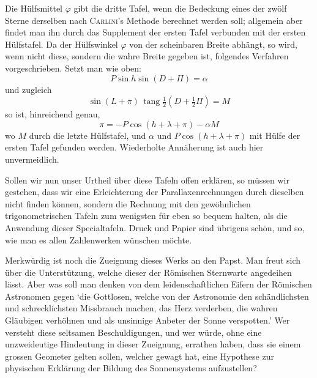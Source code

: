 Die Hülfsmittel $\varphi$ gibt die dritte Tafel, wenn die Bedeckung eines der zwölf Sterne derselben
nach \textsc{Carlini}'s Methode berechnet werden soll; allgemein aber findet man ihn durch das Supplement der
ersten Tafel verbunden mit der ersten Hülfstafel. Da der Hülfswinkel $\varphi$ von der scheinbaren Breite
abhängt, so wird, wenn nicht diese, sondern die wahre Breite gegeben ist, folgendes Verfahren vorgeschrieben. Setzt man wie oben:
\[
P \sin h \sin(D+\Pi) = \alpha
\]
und zugleich
\[
\sin(L+\pi)\,\operatorname{tang}\tfrac{1}{2}(D+\tfrac{1}{2}\Pi) = M
\]
so ist, hinreichend genau,
\[
\pi = -P\cos(h+\lambda+\pi) - \alpha M
\]
wo $M$ durch die letzte Hülfstafel, und $\alpha$ und $P\cos(h+\lambda+\pi)$ mit Hülfe der ersten Tafel gefunden werden. Wiederholte Annäherung ist auch hier unvermeidlich.

Sollen wir nun unser Urtheil über diese Tafeln offen erklären, so müssen wir gestehen, dass wir eine Erleichterung der Parallaxenrechnungen durch dieselben nicht finden können, sondern die Rechnung mit den gewöhnlichen trigonometrischen Tafeln zum wenigsten für eben so bequem halten, als die Anwendung dieser Specialtafeln. Druck und Papier sind übrigens schön, und so, wie man es allen Zahlenwerken wünschen möchte.

Merkwürdig ist noch die Zueignung dieses Werks an den Papst. Man freut sich über die Unterstützung, welche dieser der Römischen Sternwarte angedeihen lässt. Aber was soll man denken von dem leidenschaftlichen Eifern der Römischen Astronomen gegen `die Gottlosen, welche von der Astronomie den schändlichsten und schrecklichsten Missbrauch machen, das Herz verderben, die wahren Gläubigen verhöhnen und als unsinnige Anbeter der Sonne verspotten.' Wer versteht diese seltsamen Beschuldigungen, und wer würde, ohne eine unzweideutige Hindeutung in dieser Zueignung, errathen haben, dass sie einem grossen Geometer gelten sollen, welcher gewagt hat, eine Hypothese zur physischen Erklärung der Bildung des Sonnensystems aufzustellen?
